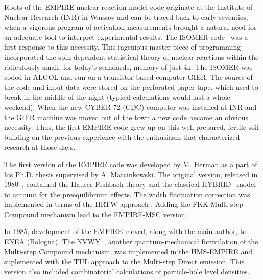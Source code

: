 Roots of the EMPIRE nuclear reaction model code originate at the Institute
of Nuclear Research (INR) in Warsaw and can be traced back to early
seventies, when a vigorous program of activation measurements brought a
natural need for an adequate tool to interpret experimental results. The
ISOMER code~\cite{Grochulski:73} was a first response to this necessity.
This ingenious master-piece of programming incorporated the spin-dependent
statistical theory of nuclear reactions within the ridiculously small, for
today's standards, memory of just 4k. The ISOMER was coded in ALGOL and run
on a transistor based computer GIER. The source of the code and input data
were stored on the perforated paper tape, which used to break in the middle
of the night (typical calculations would last a whole weekend). When the new
CYBER-72 (CDC) computer was installed at INR and the GIER machine was moved
out of the town a new code became an obvious necessity. Thus, the first
EMPIRE code grew up on this well prepared, fertile soil building on the
previous experience with the enthusiasm that characterized research at those
days.

The first version of the EMPIRE code was developed by M. Herman as a part of
his Ph.D. thesis supervised by A. Marcinkowski. The original version,
released in 1980~\cite{EMPIRE-I}, contained the Hauser-Feshbach theory and
the classical HYBRID~\cite{hybrid, hybrid1, hybrid2, hybrid3} model to
account for the preequilibrium effects. The width fluctuation correction was
implemented in terms of the HRTW approach \cite{HRTW,HHM}. Adding the FKK
Multi-step Compound mechanism \cite{FKK} lead to the EMPIRE-MSC version.

In 1985, development of the EMPIRE moved, along with the main author, to
ENEA (Bologna). The NVWY~\cite{NVWY}, another quantum-mechanical formulation
of the Multi-step Compound mechanism, was implemented in the HMS-EMPIRE and
suplemented with the TUL approach\cite{TUL} to the Multi-step Direct
emission. This version also included combinatorial calculations of
particle-hole level densities.

